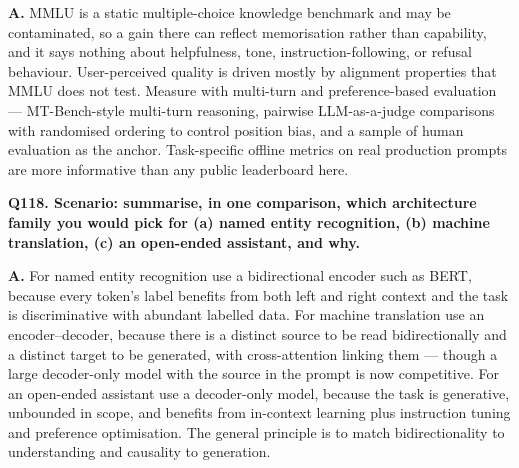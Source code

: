 \documentclass[11pt]{article}
\begin{document}
\noindent\textbf{A.} MMLU is a static multiple-choice knowledge benchmark and may be contaminated, so a gain there can reflect memorisation rather than capability, and it says nothing about helpfulness, tone, instruction-following, or refusal behaviour. User-perceived quality is driven mostly by alignment properties that MMLU does not test. Measure with multi-turn and preference-based evaluation --- MT-Bench-style multi-turn reasoning, pairwise LLM-as-a-judge comparisons with randomised ordering to control position bias, and a sample of human evaluation as the anchor. Task-specific offline metrics on real production prompts are more informative than any public leaderboard here.

\medskip
\noindent\textbf{Q118. Scenario: summarise, in one comparison, which architecture family you would pick for (a) named entity recognition, (b) machine translation, (c) an open-ended assistant, and why.}

\noindent\textbf{A.} For named entity recognition use a bidirectional encoder such as BERT, because every token's label benefits from both left and right context and the task is discriminative with abundant labelled data. For machine translation use an encoder--decoder, because there is a distinct source to be read bidirectionally and a distinct target to be generated, with cross-attention linking them --- though a large decoder-only model with the source in the prompt is now competitive. For an open-ended assistant use a decoder-only model, because the task is generative, unbounded in scope, and benefits from in-context learning plus instruction tuning and preference optimisation. The general principle is to match bidirectionality to understanding and causality to generation.
\end{document}
